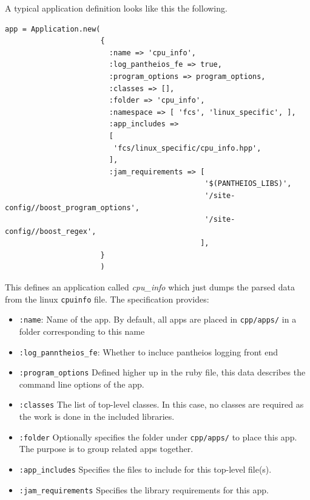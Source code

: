 \documentclass[11pt]{article}
\begin{document}
   A typical application definition looks like this the
   following. 


\lstset{language=Ruby}
\begin{lstlisting}
app = Application.new(
                      { 
                        :name => 'cpu_info',
                        :log_pantheios_fe => true,
                        :program_options => program_options,
                        :classes => [],
                        :folder => 'cpu_info',
                        :namespace => [ 'fcs', 'linux_specific', ],
                        :app_includes => 
                        [ 
                         'fcs/linux_specific/cpu_info.hpp',
                        ],
                        :jam_requirements => [ 
                                              '$(PANTHEIOS_LIBS)',
                                              '/site-config//boost_program_options',
                                              '/site-config//boost_regex',
                                             ],
                      }
                      )
\end{lstlisting}




   This defines an application called \emph{cpu\_{}info} which just dumps the
   parsed data from the linux \texttt{cpuinfo} file. The specification
   provides:
\begin{itemize}
\item \texttt{:name}: Name of the app. By default, all apps are placed in
     \texttt{cpp/apps/} in a folder corresponding to this name
\item \texttt{:log\_panntheios\_fe}: Whether to incluce pantheios logging front
     end
\item \texttt{:program\_options} Defined higher up in the ruby file, this data
     describes the command line options of the app.
\item \texttt{:classes} The list of top-level classes. In this case, no
     classes are required as the work is done in the included
     libraries.
\item \texttt{:folder} Optionally specifies the folder under \texttt{cpp/apps/} to
     place this app. The purpose is to group related apps together.
\item \texttt{:app\_includes} Specifies the files to include for this top-level
     file(s).
\item \texttt{:jam\_requirements} Specifies the library requirements for this
     app.
\end{itemize}
\end{document}
